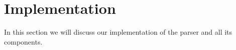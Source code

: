 \section{Implementation}
In this section we will discuss our implementation of the parser and all its components.















